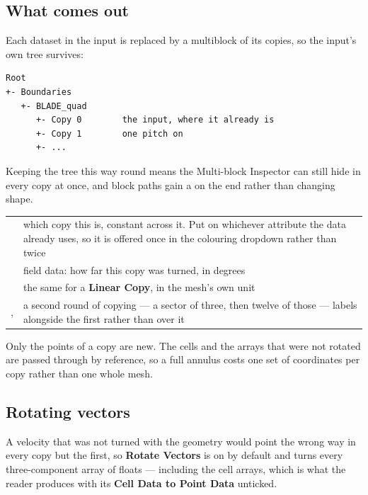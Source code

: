 \documentclass[11pt,a4paper]{article}
\newcommand{\prop}[1]{\textbf{#1}}          %
\newcommand{\menu}[1]{\textbf{#1}}          %
\begin{document}
\subsection{What comes out}

Each dataset in the input is replaced by a multiblock of its copies, so the
input's own tree survives:

\begin{lstlisting}[style=plain]
Root
+- Boundaries
   +- BLADE_quad
      +- Copy 0        the input, where it already is
      +- Copy 1        one pitch on
      +- ...
\end{lstlisting}

Keeping the tree this way round means the Multi-block Inspector can still hide
 in every copy at once, and block paths gain a 
on the end rather than changing shape.

\begin{center}
\begin{tabular}{@{}L{34mm}L{92mm}@{}}
\toprule
{} & which copy this is, constant across it. Put on whichever
  attribute the data already uses, so it is offered once in the colouring
  dropdown rather than twice \\
 & field data: how far this copy was turned, in degrees \\
 & the same for a \menu{Linear Copy}, in the mesh's own unit \\
,  & a second round of copying --- a sector of
  three, then twelve of those --- labels alongside the first rather than over it \\
\bottomrule
\end{tabular}
\end{center}

Only the points of a copy are new. The cells and the arrays that were not
rotated are passed through by reference, so a full annulus costs one set of
coordinates per copy rather than one whole mesh.

\subsection{Rotating vectors}
\label{sec:vectors}

A velocity that was not turned with the geometry would point the wrong way in
every copy but the first, so \prop{Rotate Vectors} is on by default and turns
every three-component array of floats --- including the cell arrays, which is
what the reader produces with its \prop{Cell Data to Point Data} unticked.
\end{document}
